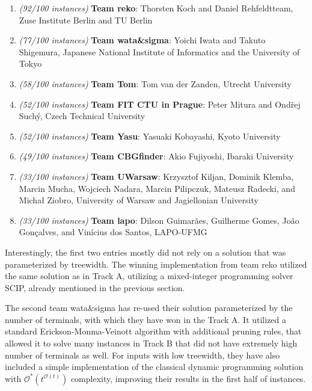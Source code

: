 \documentclass[thesis=M,english,hidelinks]{FITthesis}[2012/10/20]
\theoremstyle{definition}
\begin{document}
\begin{enumerate}
    \item \emph{(92/100 instances)} \textbf{Team reko}: Thorsten Koch and Daniel Rehfeldtteam, Zuse Institute
        Berlin and TU Berlin
    \item \emph{(77/100 instances)} \textbf{Team wata\&sigma}: Yoichi Iwata and Takuto Shigemura, Japanese National
        Institute of Informatics and the University of Tokyo
    \item \emph{(58/100 instances)} \textbf{Team Tom}: Tom van der Zanden, Utrecht University
    \item \emph{(52/100 instances)} \textbf{Team FIT CTU in Prague}: Peter Mitura and Ondřej Suchý, Czech Technical
        University
        \addtocounter{enumi}{-1}
    \item \emph{(52/100 instances)} \textbf{Team Yasu}: Yasuaki Kobayashi, Kyoto University
        \addtocounter{enumi}{1}
    \item \emph{(49/100 instances)} \textbf{Team CBGfinder}: Akio Fujiyoshi, Ibaraki University
    \item \emph{(33/100 instances)} \textbf{Team UWarsaw}: Krzysztof Kiljan, Dominik Klemba, Marcin Mucha, Wojciech
        Nadara, Marcin Pilipczuk, Mateusz Radecki, and Michał Ziobro, University of Warsaw and Jagiellonian University
        \addtocounter{enumi}{-1}
    \item \emph{(33/100 instances)} \textbf{Team lapo}: Dilson Guimarães, Guilherme Gomes, João Gonçalves, and Vinícius dos
        Santos, LAPO-UFMG
        \addtocounter{enumi}{1}
\end{enumerate}


Interestingly, the first two entries mostly did not rely on a solution that was parameterized by treewidth. The winning
implementation from team reko utilized the same solution as in Track A, utilizing a mixed-integer programming solver
SCIP, already mentioned in the previous section.

The second team wata\&sigma has re-used their solution parameterized by the number of terminals, with which they have
won in the Track A. It utilized a standard Erickson-Monma-Veinott algorithm with additional pruning rules, that
allowed it to solve many instances in Track B that did not have extremely high number of terminals as well. For inputs
with low treewidth, they have also included a simple implementation of the classical dynamic programming solution with
$\mathcal{O}^*(t^{\mathcal{O}(t)})$ complexity, improving their results in the first half of instances.
\end{document}
